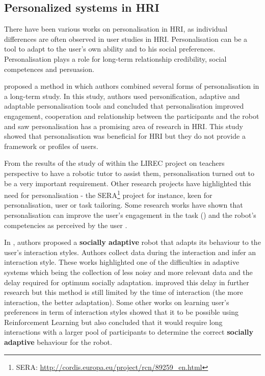 \documentclass[a4paper,twocolumn]{svjour3}
\begin{document}
\subsection{Personalized systems in HRI}
There have been various works on personalisation in HRI, as individual differences are often observed in user studies in HRI. 
Personalisation can be a tool to adapt to the user's own ability and to his social preferences.
Personalisation plays a role for long-term relationship credibility, social competences and persuasion. 

\cite{Lee2012} proposed a method in which authors combined several forms of personalisation in a long-term study. 
In this study, authors used personification, adaptive and adaptable personalisation tools and concluded that personalisation improved engagement, cooperation and relationship between the participants and the robot and saw personalisation has a promising area of research in HRI. 
This study showed that personalisation was beneficial for HRI but they do not provide a framework or profiles of users. 

From the results of the study of \cite{Jones2013} within the LIREC project on teachers perspective to have a robotic tutor to assist them, personalisation turned out to be a very important requirement. 
Other research projects have highlighted this need for personalisation - the SERA\footnote{SERA: \url{http://cordis.europa.eu/project/rcn/89259_en.html}} project for instance, keen for personalisation, user or task tailoring. 
Some research works have shown that personalisation can improve the user's engagement in the task (\cite{Corrigan2013}) and the robot's competencies as perceived  by the user \cite{Fasola2012}.


In \cite{Francois2007a}, authors proposed a \textbf{socially adaptive} robot that adapts its behaviour to the user's interaction styles. Authors collect data during the interaction and infer an interaction style. 
These works highlighted one of the difficulties in adaptive systems which being the collection of less noisy and more relevant data and the delay required for optimum socially adaptation. 
\cite{Francois2009a} improved this delay in further research but this method is still limited by the time of interaction (the more interaction, the better adaptation). 
Some other works \cite{Castro-Gonzalez2011} on learning user's preferences in term of interaction styles showed that it to be possible using Reinforcement Learning but also concluded that it would require long interactions with a larger pool of participants to determine the correct \textbf{socially adaptive} behaviour for the robot. 
\end{document}
